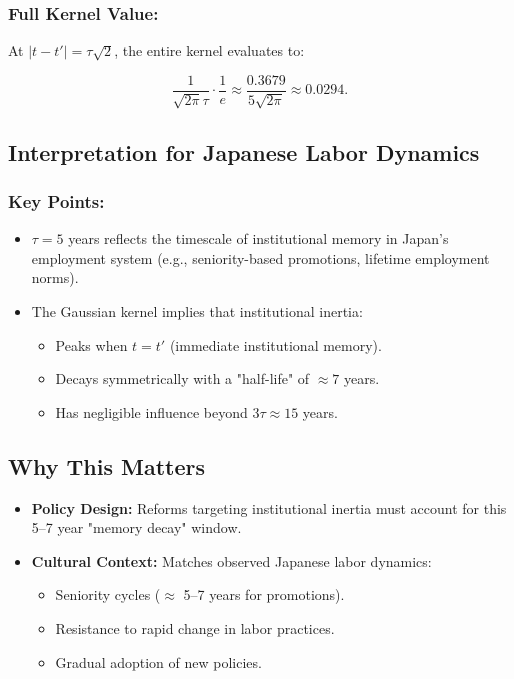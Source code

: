\documentclass[10pt]{article}
\theoremstyle{definition}
\begin{document}
\subsubsection{Full Kernel Value:}

At $|t - t'| = \tau\sqrt{2}$, the entire kernel evaluates to:

\begin{equation}
\frac{1}{\sqrt{2\pi}\tau} \cdot \frac{1}{e} \approx \frac{0.3679}{5\sqrt{2\pi}} \approx 0.0294.
\end{equation}

\subsection{Interpretation for Japanese Labor Dynamics}

\subsubsection{Key Points:}

\begin{itemize}
    \item $\tau = 5$ years reflects the timescale of institutional memory in Japan’s employment system (e.g., seniority-based promotions, lifetime employment norms).
    \item The Gaussian kernel implies that institutional inertia:
        \begin{itemize}
            \item Peaks when $t = t'$ (immediate institutional memory).
            \item Decays symmetrically with a "half-life" of $\approx 7$ years.
            \item Has negligible influence beyond $3\tau \approx 15$ years.
        \end{itemize}
\end{itemize}

\subsection{Why This Matters}

\begin{itemize}
    \item \textbf{Policy Design:} Reforms targeting institutional inertia must account for this 5–7 year "memory decay" window.
    \item \textbf{Cultural Context:} Matches observed Japanese labor dynamics:
        \begin{itemize}
            \item Seniority cycles ($\approx$ 5–7 years for promotions).
            \item Resistance to rapid change in labor practices.
            \item Gradual adoption of new policies.
        \end{itemize}
\end{itemize}
\end{document}
